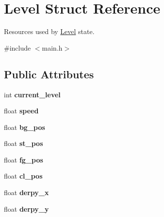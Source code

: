 \hypertarget{structLevel}{\section{\-Level \-Struct \-Reference}
\label{structLevel}
}


\-Resources used by \hyperlink{structLevel}{\-Level} state.  




{\ttfamily \#include $<$main.\-h$>$}

\subsection*{\-Public \-Attributes}
\begin{DoxyCompactItemize}
\item 
\hypertarget{structLevel_a1ba3ee0104c912dde5d6e70fee889512}{int {\bfseries current\-\_\-level}}\label{structLevel_a1ba3ee0104c912dde5d6e70fee889512}

\item 
\hypertarget{structLevel_a936a1d131d1e056878474ca831c5e88f}{float {\bfseries speed}}\label{structLevel_a936a1d131d1e056878474ca831c5e88f}

\item 
\hypertarget{structLevel_a00321214fdc30f67615053d1ca614948}{float {\bfseries bg\-\_\-pos}}\label{structLevel_a00321214fdc30f67615053d1ca614948}

\item 
\hypertarget{structLevel_ab13f799d9e2e06a04debbd97676fb512}{float {\bfseries st\-\_\-pos}}\label{structLevel_ab13f799d9e2e06a04debbd97676fb512}

\item 
\hypertarget{structLevel_a665bb93951ab6b7a91543712152a3acf}{float {\bfseries fg\-\_\-pos}}\label{structLevel_a665bb93951ab6b7a91543712152a3acf}

\item 
\hypertarget{structLevel_af466533be369b5ce1f48196a7f3b7b0b}{float {\bfseries cl\-\_\-pos}}\label{structLevel_af466533be369b5ce1f48196a7f3b7b0b}

\item 
\hypertarget{structLevel_ae5a97d5b61c70c63e93992a9ff3935f9}{float {\bfseries derpy\-\_\-x}}\label{structLevel_ae5a97d5b61c70c63e93992a9ff3935f9}

\item 
\hypertarget{structLevel_a7b3c0f5af134797a1ed21ef48da3ab00}{float {\bfseries derpy\-\_\-y}}\label{structLevel_a7b3c0f5af134797a1ed21ef48da3ab00}


\end{DoxyCompactItemize}
